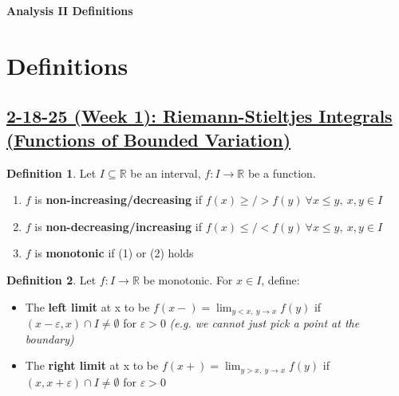 \documentclass[12pt,a4paper]{article}
\theoremstyle{definition}
\newtheorem{definition}{Definition}[subsection]
\begin{document}
\begin{center}
  {\Large \bf Analysis II Definitions}\\[6pt]
\end{center}

\section*{Definitions}
\setcounter{definition}{0}
\subsection*{\underline{\textbf{2-18-25 (Week 1): Riemann-Stieltjes Integrals (Functions of Bounded Variation)}}}
\begin{definition}
  Let $I \subseteq \mathbb{R}$ be an interval, $f: I \rightarrow \mathbb{R}$ be a function.
  \begin{enumerate} [(1)]
    \item $f$ is \textbf{non-increasing/decreasing} if $f(x) \geq/> f(y) \ \forall x \leq y, \ x, y \in I$
    \item $f$ is \textbf{non-decreasing/increasing} if $f(x) \leq/< f(y) \ \forall x \leq y, \ x, y \in I$
    \item $f$ is \textbf{monotonic} if (1) or (2) holds
  \end{enumerate}
\end{definition}
\vspace{0.125em}

\begin{definition}
  Let $f: I \rightarrow \mathbb{R}$ be monotonic.
  For $x \in I$, define:
  \begin{itemize}
    \item The \textbf{left limit} at x to be \underline{$f(x-) = \lim_{y < x, \ y \rightarrow x} f(y)$} if $(x - \varepsilon, x) \cap I \neq \emptyset$ for $\varepsilon > 0$ \textit{(e.g. we cannot just pick a point at the boundary)}
    \item The \textbf{right limit} at x to be \underline{$f(x+) = \lim_{y > x, \ y \rightarrow x} f(y)$} if $(x, x + \varepsilon) \cap I \neq \emptyset$ for $\varepsilon > 0$
  \end{itemize}
\end{definition}
\vspace{0.125em}
\end{document}
